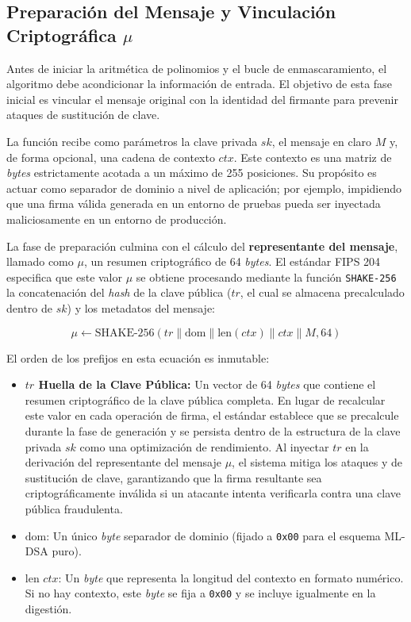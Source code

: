 \documentclass[11pt, a4paper]{report}
\theoremstyle{definition}
\begin{document}
\subsection{Preparación del Mensaje y Vinculación Criptográfica $\mu$}

Antes de iniciar la aritmética de polinomios y el bucle de enmascaramiento, el algoritmo debe acondicionar la información de entrada. El objetivo de esta fase inicial es vincular el mensaje original con la identidad del firmante para prevenir ataques de sustitución de clave.

La función recibe como parámetros la clave privada $sk$, el mensaje en claro $M$ y, de forma opcional, una cadena de contexto $ctx$. Este contexto es una matriz de \textit{bytes} estrictamente acotada a un máximo de 255 posiciones. Su propósito es actuar como separador de dominio a nivel de aplicación; por ejemplo, impidiendo que una firma válida generada en un entorno de pruebas pueda ser inyectada maliciosamente en un entorno de producción. 

La fase de preparación culmina con el cálculo del \textbf{representante del mensaje}, llamado como $\mu$, un resumen criptográfico de 64 \textit{bytes}. El estándar FIPS 204 especifica que este valor $\mu$ se obtiene procesando mediante la función \texttt{SHAKE-256} la concatenación del \textit{hash} de la clave pública ($tr$, el cual se almacena precalculado dentro de $sk$) y los metadatos del mensaje:

\begin{equation}
    \mu \leftarrow \text{SHAKE-256}(tr \parallel \text{dom} \parallel \text{len}(ctx) \parallel ctx \parallel M, 64)
\end{equation}

El orden de los prefijos en esta ecuación es inmutable:
\begin{itemize}
    \item \textbf{$tr$ Huella de la Clave Pública:} Un vector de 64 \textit{bytes} que contiene el resumen criptográfico  de la clave pública completa. En lugar de recalcular este valor en cada operación de firma, el estándar establece que se precalcule durante la fase de generación y se persista dentro de la estructura de la clave privada $sk$ como una optimización de rendimiento. Al inyectar $tr$ en la derivación del representante del mensaje $\mu$, el sistema mitiga los ataques y de sustitución de clave, garantizando que la firma resultante sea criptográficamente inválida si un atacante intenta verificarla contra una clave pública fraudulenta.
    \item $\text{dom}$: Un único \textit{byte} separador de dominio (fijado a \texttt{0x00} para el esquema ML-DSA puro).
    \item $\text{len } ctx$: Un \textit{byte} que representa la longitud del contexto en formato numérico. Si no hay contexto, este \textit{byte} se fija a \texttt{0x00} y se incluye igualmente en la digestión.
\end{itemize}
\end{document}
